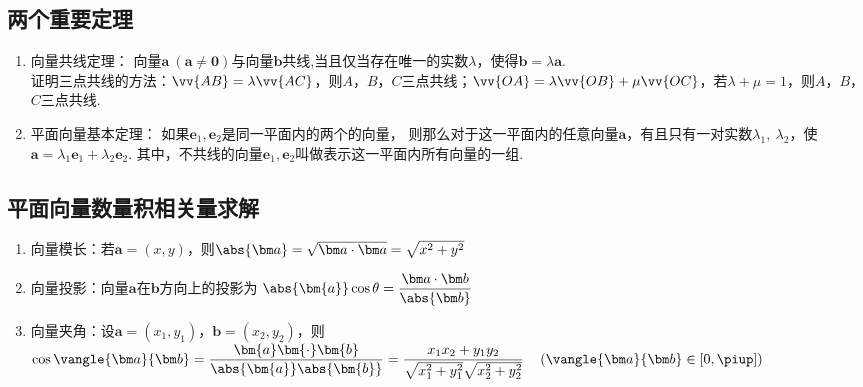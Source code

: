   \subsection{两个重要定理}
    \begin{enumerate}[label=\arabic*)]
      \item 向量共线定理：
        向量$\bm{a}~(\bm{a}\ne\bm{0})$与向量$\bm{b}$共线,当且仅当存在唯一的实数$ \lambda $，使得$\bm{b}=\lambda\bm{a}$.\\
        {\FCom
         证明三点共线的方法：$\vv{AB}=\lambda\vv{AC}$，则$A$，$B$，$C$三点共线；$\vv{OA}=\lambda\vv{OB}+\mu\vv{OC}$，若$\lambda+\mu=1$，则$A$，$B$，$C$三点共线.
        }
      \item 平面向量基本定理：
        如果$ \bm{e}_1,\bm{e}_2 $是同一平面内的两个的向量，
        则那么对于这一平面内的任意向量$ \bm{a} $，有且只有一对实数$ \lambda_1,~\lambda_2 $，使$\bm{a}=\lambda_1\bm{e}_1+\lambda_2\bm{e}_2$.
        其中，不共线的向量$\bm{e}_1, \bm{e}_2$叫做表示这一平面内所有向量的一组.\\
    \end{enumerate}
  \subsection{平面向量数量积相关量求解}
    \begin{enumerate}[label=\arabic*)]
      \item 向量模长：若$\bm a=(x,y)$，则$\abs{\bm a}=\sqrt{\bm a\cdot\bm a}=\sqrt{x^2+y^2}$
      \item 向量投影：向量$\bm a$在$\bm b$方向上的投影为
        $\abs{\bm{a}}\cos\theta=\dfrac{\bm a\cdot\bm b}{\abs{\bm b}}$
      \item 向量夹角：设$\bm a=(x_1,y_1)$，$\bm b=(x_2,y_2)$，则
        $\cos\vangle{\bm a}{\bm b}=\dfrac{\bm{a}\bm{\cdot}\bm{b}}{\abs{\bm{a}}\abs{\bm{b}}}=\dfrac{x_1x_2+y_1y_2}{\sqrt{x_1^2+y_1^2}\sqrt{x_2^2+y_2^2}} \quad \left(\vangle{\bm a}{\bm b}\in\left[0,\piup\right]\right)$
    \end{enumerate}
